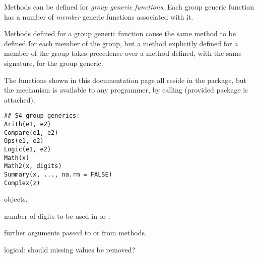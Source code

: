 %
\begin{Description}\relax
Methods can be defined for \emph{group generic functions}.  Each group
generic function has a number of \emph{member} generic functions
associated with it.

Methods  defined for a group generic function cause the same
method to be defined for each member of the group, but a method explicitly
defined for a  member of the group takes precedence over a
method defined, with the same signature, for the group generic.

The functions shown in this documentation page all reside in the
 package, but the mechanism is available to any
programmer, by calling  (provided package
 is attached).
\end{Description}
%
\begin{Usage}
\begin{verbatim}
## S4 group generics:
Arith(e1, e2)
Compare(e1, e2)
Ops(e1, e2)
Logic(e1, e2)
Math(x)
Math2(x, digits)
Summary(x, ..., na.rm = FALSE)
Complex(z)
\end{verbatim}
\end{Usage}
%
\begin{Arguments}
\begin{ldescription}
\item[\code{x, z, e1, e2}] objects.
\item[\code{digits}] number of digits to be used in  or .
\item[\code{...}] further arguments passed to or from methods.
\item[\code{na.rm}] logical: should missing values be removed?
\end{ldescription}
\end{Arguments}
%

